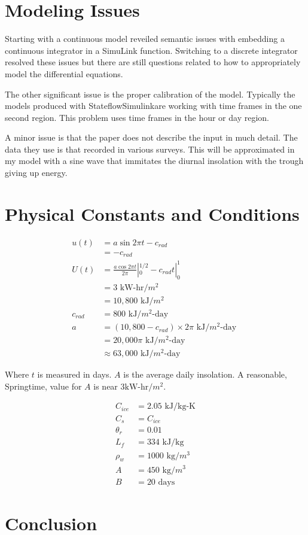 \documentclass{article}
\begin{document}
\section{Modeling Issues}

Starting with a continuous model reveiled semantic
issues with embedding a continuous integrator in a SimuLink function.
Switching to a discrete integrator resolved these issues but
there are still questions related to how to appropriately
model the differential equations.

The other significant issue is the proper calibration of the model.
Typically the models produced with
Stateflow\textregistered Simulink\textregistered are working
with time frames in the one second region.
This problem uses time frames in the hour or day region.

A minor issue is that the paper does not describe
the input in much detail.
The data they use is that recorded in various surveys.
This will be approximated in my model with a sine wave
that immitates the diurnal insolation with the trough
giving up energy.


\section{Physical Constants and Conditions}

\begin{align}
u(t) &= a \sin{2 \pi t} - c_{rad} \\
 &= - c_{rad} \\
U(t) &= \frac{a \cos{2 \pi t}}{2 \pi} |_0^{1/2} - c_{rad} t |_0^1 \\
  &= 3 \text{ kW-hr/$m^2$ } \\
  &= 10,800 \text{ kJ/$m^2$ } \\
c_{rad} &= 800 \text{ kJ/$m^2$-day } \\
a &= (10,800 - c_{rad}) \times 2 \pi \text{ kJ/$m^2$-day } \\
 &= 20,000 \pi \text{ kJ/$m^2$-day } \\
 &\approx 63,000 \text{ kJ/$m^2$-day }
\end{align}

Where $t$ is measured in days.
$A$ is the average daily insolation.
A reasonable, Springtime, value for $A$ is near $3 \text{kW-hr}/m^2$.

\begin{align}
 C_{ice} &= 2.05 \text{ kJ/kg-K} \\
 C_s &= C_{ice} \\
\theta_r &= 0.01 \\
L_f &= 334 \text{ kJ/kg} \\
\rho_w &= 1000 \text{ kg/$m^3$} \\
A &= 450 \text{ kg/$m^3$} \\
B &= 20 \text{ days}
\end{align}

 \section{Conclusion}



\end{document}

